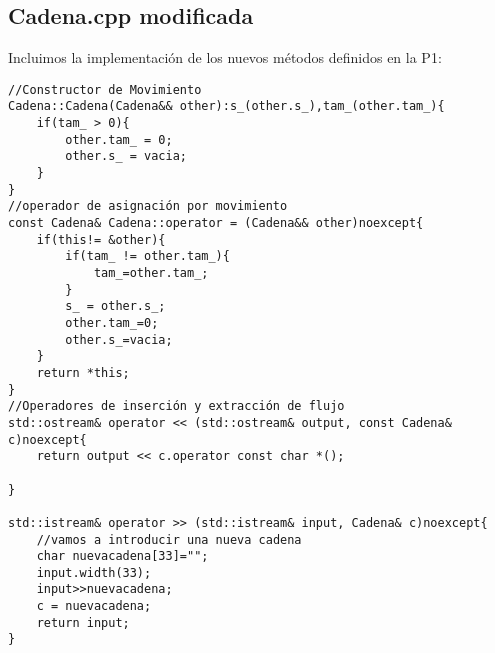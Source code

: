 \subsection{Cadena.cpp modificada}
Incluimos la implementación de los nuevos métodos definidos en la P1:
\begin{verbatim}
//Constructor de Movimiento
Cadena::Cadena(Cadena&& other):s_(other.s_),tam_(other.tam_){
    if(tam_ > 0){
        other.tam_ = 0;
        other.s_ = vacia;
    }
}
//operador de asignación por movimiento
const Cadena& Cadena::operator = (Cadena&& other)noexcept{
    if(this!= &other){
        if(tam_ != other.tam_){
            tam_=other.tam_;
        }
        s_ = other.s_;
        other.tam_=0;
        other.s_=vacia;
    }
    return *this;
}
//Operadores de inserción y extracción de flujo
std::ostream& operator << (std::ostream& output, const Cadena& c)noexcept{
    return output << c.operator const char *();

}

std::istream& operator >> (std::istream& input, Cadena& c)noexcept{
    //vamos a introducir una nueva cadena
    char nuevacadena[33]="";
    input.width(33);
    input>>nuevacadena;
    c = nuevacadena;
    return input;
}
\end{verbatim}